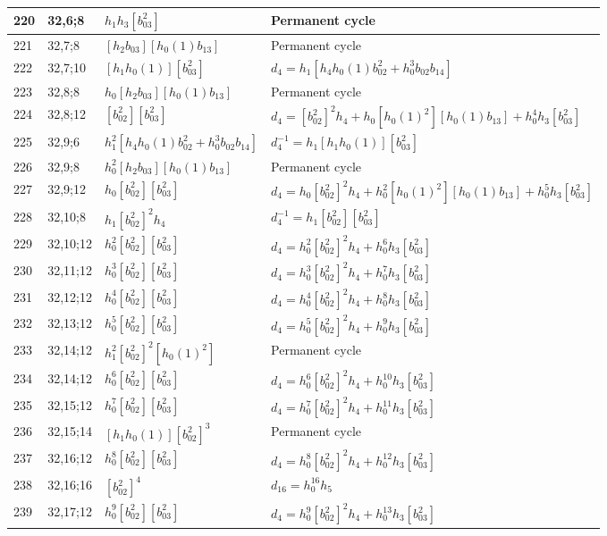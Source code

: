 \documentclass{article}
\begin{document}
\begin{longtable}{|l|l|>{\raggedright\arraybackslash}p{6cm}|>{\raggedright\arraybackslash}p{6cm}|}
\hline
220 & 32,6;8 & $h_1h_3[b_{03}^2]$ & Permanent cycle\\
\hline
221 & 32,7;8 & $[h_2b_{03}][h_0(1)b_{13}]$ & Permanent cycle\\
\hline
222 & 32,7;10 & $[h_1h_0(1)][b_{03}^2]$ &$d_{4}=h_1[h_4h_0(1)b_{02}^2 + h_0^3b_{02}b_{14}]$\\
\hline
223 & 32,8;8 & $h_0[h_2b_{03}][h_0(1)b_{13}]$ & Permanent cycle\\
\hline
224 & 32,8;12 & $[b_{02}^2][b_{03}^2]$ &$d_{4}=[b_{02}^2]^2h_4 + h_0[h_0(1)^2][h_0(1)b_{13}] + h_0^4h_3[b_{03}^2]$\\
\hline
225 & 32,9;6 & $h_1^2[h_4h_0(1)b_{02}^2 + h_0^3b_{02}b_{14}]$ & $d_{4}^{-1}=h_1[h_1h_0(1)][b_{03}^2]$\\
\hline
226 & 32,9;8 & $h_0^2[h_2b_{03}][h_0(1)b_{13}]$ & Permanent cycle\\
\hline
227 & 32,9;12 & $h_0[b_{02}^2][b_{03}^2]$ &$d_{4}=h_0[b_{02}^2]^2h_4 + h_0^2[h_0(1)^2][h_0(1)b_{13}] + h_0^5h_3[b_{03}^2]$\\
\hline
228 & 32,10;8 & $h_1[b_{02}^2]^2h_4$ & $d_{4}^{-1}=h_1[b_{02}^2][b_{03}^2]$\\
\hline
229 & 32,10;12 & $h_0^2[b_{02}^2][b_{03}^2]$ &$d_{4}=h_0^2[b_{02}^2]^2h_4 + h_0^6h_3[b_{03}^2]$\\
\hline
230 & 32,11;12 & $h_0^3[b_{02}^2][b_{03}^2]$ &$d_{4}=h_0^3[b_{02}^2]^2h_4 + h_0^7h_3[b_{03}^2]$\\
\hline
231 & 32,12;12 & $h_0^4[b_{02}^2][b_{03}^2]$ &$d_{4}=h_0^4[b_{02}^2]^2h_4 + h_0^8h_3[b_{03}^2]$\\
\hline
232 & 32,13;12 & $h_0^5[b_{02}^2][b_{03}^2]$ &$d_{4}=h_0^5[b_{02}^2]^2h_4 + h_0^9h_3[b_{03}^2]$\\
\hline
233 & 32,14;12 & $h_1^2[b_{02}^2]^2[h_0(1)^2]$ & Permanent cycle\\
234 & 32,14;12 & $h_0^6[b_{02}^2][b_{03}^2]$ &$d_{4}=h_0^6[b_{02}^2]^2h_4 + h_0^{10}h_3[b_{03}^2]$\\
\hline
235 & 32,15;12 & $h_0^7[b_{02}^2][b_{03}^2]$ &$d_{4}=h_0^7[b_{02}^2]^2h_4 + h_0^{11}h_3[b_{03}^2]$\\
\hline
236 & 32,15;14 & $[h_1h_0(1)][b_{02}^2]^3$ & Permanent cycle\\
\hline
237 & 32,16;12 & $h_0^8[b_{02}^2][b_{03}^2]$ &$d_{4}=h_0^8[b_{02}^2]^2h_4 + h_0^{12}h_3[b_{03}^2]$\\
\hline
238 & 32,16;16 & $[b_{02}^2]^4$ &$d_{16}=h_0^{16}h_5$\\
\hline
239 & 32,17;12 & $h_0^9[b_{02}^2][b_{03}^2]$ &$d_{4}=h_0^9[b_{02}^2]^2h_4 + h_0^{13}h_3[b_{03}^2]$\\

\end{longtable}
\end{document}
